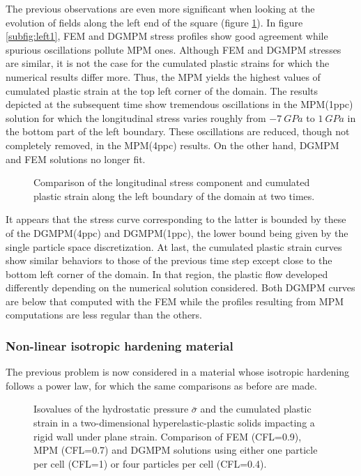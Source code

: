 The previous observations are even more significant when looking at the evolution of fields along the left end of the square (figure \ref{fig:left_line}).
In figure \ref{subfig:left1}, FEM and DGMPM stress profiles show good agreement while spurious oscillations pollute MPM ones. 
Although FEM and DGMPM stresses are similar, it is not the case for the cumulated plastic strains for which the numerical results differ more.
Thus, the MPM yields the highest values of cumulated plastic strain at the top left corner of the domain.
The results depicted at the subsequent time show tremendous oscillations in the MPM(1ppc) solution for which the longitudinal stress varies roughly from $-7 \: GPa$ to $1 \: GPa$ in the bottom part of the left boundary.
These oscillations are reduced, though not completely removed, in the MPM(4ppc) results. 
On the other hand, DGMPM and FEM solutions no longer fit.
\begin{figure}[h!]
  \centering
  {}
  {}
  
  \caption{Comparison of the longitudinal stress component and cumulated plastic strain along the left boundary of the domain at two times.}
  \label{fig:left_line}
\end{figure}
It appears that the stress curve corresponding to the latter is bounded by these of the DGMPM(4ppc) and DGMPM(1ppc), the lower bound being given by the single particle space discretization.
At last, the cumulated plastic strain curves show similar behaviors to those of the previous time step except close to the bottom left corner of the domain.
In that region, the plastic flow developed differently depending on the numerical solution considered.
Both DGMPM curves are below that computed with the FEM while the profiles resulting from MPM computations are less regular than the others.

\subsubsection{Non-linear isotropic hardening material}
\label{sec:non-linear-hardening}
The previous problem is now considered in a material whose isotropic hardening follows a power law, for which the same comparisons as before are made. 

\begin{figure}[h!]
  \centering
  \qquad
  \caption{Isovalues of the hydrostatic pressure $\bar{\sigma}$ and the cumulated plastic strain in a two-dimensional hyperelastic-plastic solids impacting a rigid wall under plane strain. Comparison of FEM (CFL=0.9), MPM (CFL=0.7) and DGMPM solutions using either one particle per cell (CFL=1) or four particles per cell (CFL=0.4).}
  \label{fig:PS_taylor_NL}
\end{figure}

